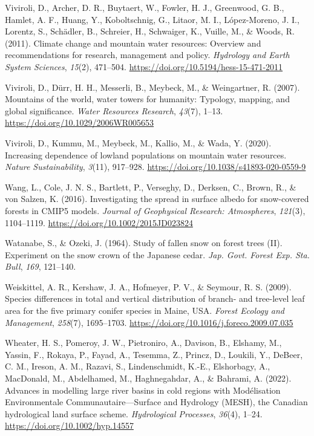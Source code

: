 \documentclass[
  letterpaper,
]{tex/uofsthesis-cs}
\newlength{\cslhangindent}
\newenvironment{CSLReferences}[2] %
 {\begin{list}{}{%
  \setlength{\itemindent}{0pt}
  \setlength{\leftmargin}{0pt}
  \setlength{\parsep}{0pt}
  \ifodd #1
   \setlength{\leftmargin}{\cslhangindent}
   \setlength{\itemindent}{-1\cslhangindent}
  \fi
  \setlength{\itemsep}{#2\baselineskip}}}
 {\end{list}}
\begin{document}
\begin{CSLReferences}{1}{0}
Viviroli, D., Archer, D. R., Buytaert, W., Fowler, H. J., Greenwood, G.
B., Hamlet, A. F., Huang, Y., Koboltschnig, G., Litaor, M. I.,
López-Moreno, J. I., Lorentz, S., Schädler, B., Schreier, H., Schwaiger,
K., Vuille, M., \& Woods, R. (2011). Climate change and mountain water
resources: {Overview} and recommendations for research, management and
policy. \emph{Hydrology and Earth System Sciences}, \emph{15}(2),
471--504. \url{https://doi.org/10.5194/hess-15-471-2011}

Viviroli, D., Dürr, H. H., Messerli, B., Meybeck, M., \& Weingartner, R.
(2007). Mountains of the world, water towers for humanity: {Typology},
mapping, and global significance. \emph{Water Resources Research},
\emph{43}(7), 1--13. \url{https://doi.org/10.1029/2006WR005653}

Viviroli, D., Kummu, M., Meybeck, M., Kallio, M., \& Wada, Y. (2020).
Increasing dependence of lowland populations on mountain water
resources. \emph{Nature Sustainability}, \emph{3}(11), 917--928.
\url{https://doi.org/10.1038/s41893-020-0559-9}

Wang, L., Cole, J. N. S., Bartlett, P., Verseghy, D., Derksen, C.,
Brown, R., \& von Salzen, K. (2016). Investigating the spread in surface
albedo for snow-covered forests in {CMIP5} models. \emph{Journal of
Geophysical Research: Atmospheres}, \emph{121}(3), 1104--1119.
\url{https://doi.org/10.1002/2015JD023824}

Watanabe, S., \& Ozeki, J. (1964). Study of fallen snow on forest trees
({II}). {Experiment} on the snow crown of the {Japanese} cedar.
\emph{Jap. Govt. Forest Exp. Sta. Bull}, \emph{169}, 121--140.

Weiskittel, A. R., Kershaw, J. A., Hofmeyer, P. V., \& Seymour, R. S.
(2009). Species differences in total and vertical distribution of
branch- and tree-level leaf area for the five primary conifer species in
{Maine}, {USA}. \emph{Forest Ecology and Management}, \emph{258}(7),
1695--1703. \url{https://doi.org/10.1016/j.foreco.2009.07.035}

Wheater, H. S., Pomeroy, J. W., Pietroniro, A., Davison, B., Elshamy,
M., Yassin, F., Rokaya, P., Fayad, A., Tesemma, Z., Princz, D., Loukili,
Y., DeBeer, C. M., Ireson, A. M., Razavi, S., Lindenschmidt, K.-E.,
Elshorbagy, A., MacDonald, M., Abdelhamed, M., Haghnegahdar, A., \&
Bahrami, A. (2022). Advances in modelling large river basins in cold
regions with {Mod{é}lisation Environmentale Communautaire}---{Surface}
and {Hydrology} ({MESH}), the {Canadian} hydrological land surface
scheme. \emph{Hydrological Processes}, \emph{36}(4), 1--24.
\url{https://doi.org/10.1002/hyp.14557}


\end{CSLReferences}
\end{document}
